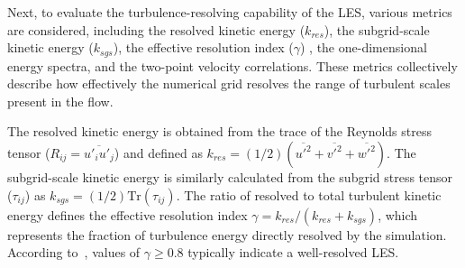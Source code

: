 Next, to evaluate the turbulence-resolving capability of the LES, various metrics are considered, including the resolved kinetic energy ($k_{res}$), the subgrid-scale kinetic energy ($k_{sgs}$), the effective resolution index ($\gamma$) \citep{pope2001turbulent}, the one-dimensional energy spectra, and the two-point velocity correlations. These metrics collectively describe how effectively the numerical grid resolves the range of turbulent scales present in the flow.

The resolved kinetic energy is obtained from the trace of the Reynolds stress tensor ($R_{ij} = \overline{u'_i u'_j}$) and defined as $k_{res} = (1/2)(\overline{u'^2} + \overline{v'^2} + \overline{w'^2})$. The subgrid-scale kinetic energy is similarly calculated from the subgrid stress tensor ($\tau_{ij}$) as $k_{sgs} = (1/2)\mathrm{Tr}(\tau_{ij})$. The ratio of resolved to total turbulent kinetic energy defines the effective resolution index $\gamma = k_{res}/(k_{res} + k_{sgs})$, which represents the fraction of turbulence energy directly resolved by the simulation. According to~\citet{pope2001turbulent}, values of $\gamma \ge 0.8$ typically indicate a well-resolved LES. 

